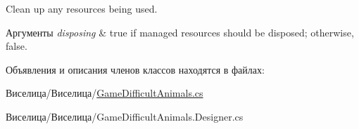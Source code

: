 Clean up any resources being used. 


\begin{DoxyParams}{Аргументы}
{\em disposing} & true if managed resources should be disposed; otherwise, false.\\
\hline
\end{DoxyParams}


Объявления и описания членов классов находятся в файлах\+:\begin{DoxyCompactItemize}
\item 
Виселица/Виселица/\hyperlink{_game_difficult_animals_8cs}{Game\+Difficult\+Animals.\+cs}\item 
Виселица/Виселица/Game\+Difficult\+Animals.\+Designer.\+cs\end{DoxyCompactItemize}
